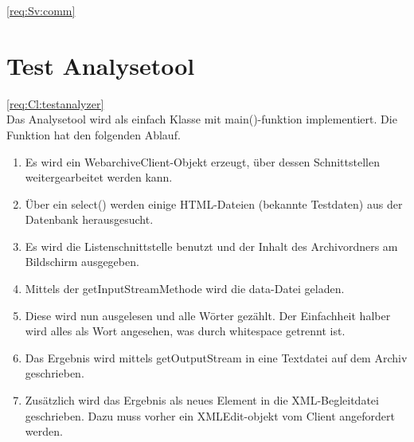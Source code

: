 \ref{req:Sv:comm}
\section{Test Analysetool} 
\liable{\sab} 
\ref{req:Cl:testanalyzer} \\
	Das Analysetool wird als einfach Klasse mit main()-funktion implementiert.
	Die Funktion hat den folgenden Ablauf.
	\begin{enumerate}
		\item Es wird ein WebarchiveClient-Objekt erzeugt, über dessen Schnittstellen weitergearbeitet werden kann.
		\item Über ein select() werden einige HTML-Dateien (bekannte Testdaten) aus der Datenbank herausgesucht.
		\item Es wird die Listenschnittstelle benutzt und der Inhalt des Archivordners am Bildschirm ausgegeben.
		\item Mittels der getInputStreamMethode wird die data-Datei geladen.
		\item Diese wird nun ausgelesen und alle Wörter gezählt. Der Einfachheit halber wird alles als Wort angesehen, was durch whitespace getrennt ist.
		\item Das Ergebnis wird mittels  getOutputStream in eine Textdatei auf dem Archiv geschrieben.
		\item Zusätzlich wird das Ergebnis als neues Element in die XML-Begleitdatei geschrieben.
			Dazu muss vorher ein XMLEdit-objekt vom Client angefordert werden.
	\end{enumerate}
		
